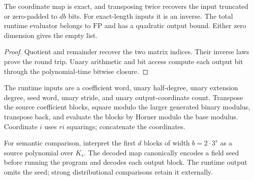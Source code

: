\begin{theorem}
  \label{thm:lowerbounds-algebraic-bit-transpose}
  \leanok
  The coordinate map is exact, and transposing twice recovers
  the input truncated or zero-padded to $db$ bits. For exact-length
  inputs it is an inverse. The total runtime evaluator belongs
  to $\mathrm{FP}$ and has a quadratic output bound. Either zero
  dimension gives the empty list.
\end{theorem}
\begin{proof}
  \leanok
  Quotient and remainder recover the two matrix indices. Their
  inverse laws prove the round trip. Unary arithmetic and bit access
  compute each output bit through the polynomial-time bitwise closure.
\end{proof}

\begin{definition}
  \label{def:lowerbounds-algebraic-encoded-condenser}
  \leanok
  The runtime inputs are a coefficient word, unary half-degree,
  unary extension degree, seed word, unary stride, and unary
  output-coordinate count. Transpose the source coefficient blocks,
  square modulo the larger generated binary modulus, transpose back,
  and evaluate the blocks by Horner modulo the base modulus.
  Coordinate $i$ uses $ri$ squarings; concatenate the coordinates.

  For semantic comparison, interpret the first $d$ blocks of width
  $b=2\cdot3^s$ as a source polynomial over $K_s$. The decoded map
  canonically encodes a field seed before running the program and
  decodes each output block. The runtime output omits the seed;
  strong distributional comparisons retain it externally.
\end{definition}

